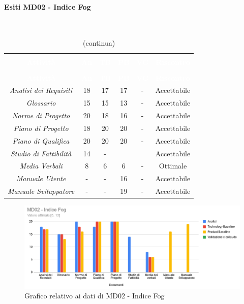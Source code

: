 \paragraph{Esiti MD02 - Indice Fog} \mbox{} \\
\begin{longtable}{c c c c c c}
\rowcolor{white}\caption{Esiti MD02 - Indice Fog} \\
		\rowcolor{redafk}
\textcolor{white}{\textbf{Attività}} &
\textcolor{white}{\textbf{An}} &
\textcolor{white}{\textbf{TB}} &
\textcolor{white}{\textbf{PB}} &
\textcolor{white}{\textbf{VC}} &
\textcolor{white}{\textbf{Riscontro}}  \\
		\endfirsthead
		\rowcolor{white}\caption[]{(continua)} \\
		\rowcolor{redafk}
\textcolor{white}{\textbf{Attività}} &
\textcolor{white}{\textbf{An}} &
\textcolor{white}{\textbf{TB}} &
\textcolor{white}{\textbf{PB}} &
\textcolor{white}{\textbf{VC}} &
\textcolor{white}{\textbf{Riscontro}}  \\
		\endhead
\textit{Analisi dei Requisiti} & 18 & 17 & 17 & - & Accettabile\\
\textit{Glossario} & 15 & 15 & 13 & - & Accettabile \\
\textit{Norme di Progetto} & 20 & 18 & 16 & - & Accettabile\\
\textit{Piano di Progetto} & 18 & 20 & 20 & - & Accettabile\\
\textit{Piano di Qualifica} & 20 & 20 & 20 & - & Accettabile\\
\textit{Studio di Fattibilità} & 14 & - & & & Accettabile\\
\textit{Media Verbali} & 8 & 6 & 6 & - & Ottimale\\
\textit{Manuale Utente} & - & - & 16 & - & Accettabile \\
\textit{Manuale Sviluppatore} & - & - & 19 & - & Accettabile\\
\end{longtable}

\begin{figure}[H]
\centering
\includegraphics[scale=0.6]{./img/MD02_fog.png}
\caption{Grafico relativo ai dati di MD02 - Indice Fog}
\end{figure}


